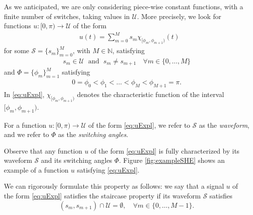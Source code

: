 \documentclass[twocolumn]{autart}    %
\begin{document}
As we anticipated,  we are only considering piece-wise constant functions, with a finite number of switches, taking values in $\mathcal{U}$.
More precisely, we look for functions $u: [0,\pi)\to \mathcal{U}$ of the form
\begin{align}\label{eq:uExpl}
	&u (t)= \sum_{m=0}^M s_m\chi_{[\phi_m,\phi_{m+1})} (t)
\end{align}
for some $\mathcal{S} = \{ s_m\}_{m=0}^M$,  with $M\in \mathbb{N}$, satisfying
\begin{align*}
	s_m\in \mathcal{U} \; \text{ and } \; s_m\neq s_{m+1} \quad \forall m\in \{0,\ldots, M\}
\end{align*}
and $\Phi = \{ \phi_m\}_{m=1}^{M}$ satisfying
\begin{align*}
	0= \phi_0 < \phi_1 <\ldots < \phi_M < \phi_{M+1} = \pi .
\end{align*}
In \eqref{eq:uExpl}, $\chi_{[\phi_m,\phi_{m+1})}$ denotes the characteristic function of the interval $[\phi_m,\phi_{m+1})$.

\medskip

\begin{definition}\label{def: waveform and switching angles}
For a function $u: [0,\pi) \to \mathcal{U}$ of the form \eqref{eq:uExpl}, we refer to $\mathcal{S}$ as the \emph{waveform}, and we refer to $\Phi$ as the \emph{switching angles}.
\end{definition}

Observe that any function $u$ of the form \eqref{eq:uExpl} is fully characterized by its waveform $\mathcal{S}$ and its switching angles $\Phi$.
Figure \ref{fig:exampleSHE} shows an example of a function $u$ satisfying \eqref{eq:uExpl}. 

We can rigorously formulate this property as follows: we say that a signal $u$ of the form \eqref{eq:uExpl} satisfies the staircase property if its waveform $\mathcal{S}$ satisfies
\begin{equation}\label{eq:staircase prop}
	(s_m,s_{m+1}) \cap \mathcal{U} = \emptyset, \quad \forall m\in \{ 0, \ldots, M-1 \}.
\end{equation}

\end{document}
